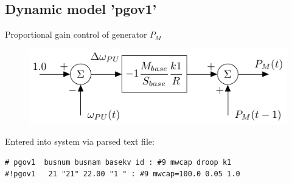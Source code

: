 \documentclass[14pt, unknownkeysallowed]{beamer}
\begin{document}
\subsection{Dynamic model 'pgov1'}
\begin{frame}[fragile]
Proportional gain control of generator $P_M$ 
\begin{figure}
	\includegraphics[width=\linewidth]{pgov1}
\end{figure}
Entered into system via parsed text file:
\begin{lstlisting}[basicstyle=\footnotesize]
# pgov1  busnum busnam basekv id : #9 mwcap droop k1
#!pgov1   21 "21" 22.00 "1 " : #9 mwcap=100.0 0.05 1.0
\end{lstlisting}
\end{frame}

\end{document}
